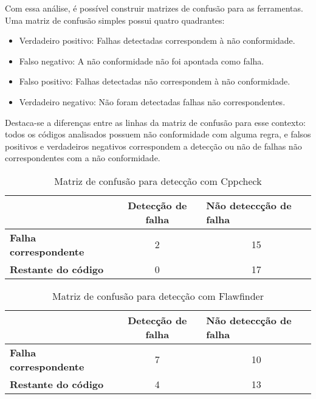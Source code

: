 Com essa análise, é possível construir matrizes de confusão para as ferramentas. Uma matriz de confusão simples possui quatro quadrantes:
\begin{itemize}
  \item Verdadeiro positivo: Falhas detectadas correspondem à não conformidade.
  \item Falso negativo: A não conformidade não foi apontada como falha.
  \item Falso positivo: Falhas detectadas não correspondem à não conformidade.
  \item Verdadeiro negativo: Não foram detectadas falhas não correspondentes.
\end{itemize}

Destaca-se a diferenças entre as linhas da matriz de confusão para esse contexto: todos os códigos analisados possuem não conformidade com alguma regra, e falsos positivos e verdadeiros negativos correspondem a detecção ou não de falhas não correspondentes com a não conformidade.

\begin{table}[ht]
  \begin{tabular}{@{}lcc@{}}
  \toprule
                      & \textbf{Detecção de falha} & \multicolumn{1}{l}{\textbf{Não deteccção de falha}} \\ \midrule
  \textbf{Falha correspondente} & 2                        & 15                                               \\
  \textbf{Restante do código} & 0                        & 17                                               \\ \bottomrule
  \end{tabular}
  \caption{Matriz de confusão para detecção com Cppcheck}
  \label{tab:cppcheck}
  \end{table}

\begin{table}[ht]
\begin{tabular}{@{}lcc@{}}
\toprule
                    & \textbf{Detecção de falha} & \multicolumn{1}{l}{\textbf{Não deteccção de falha}} \\ \midrule
\textbf{Falha correspondente} & 7                        & 10                                               \\
\textbf{Restante do código} & 4                        & 13                                               \\ \bottomrule
\end{tabular}
\caption{Matriz de confusão para detecção com Flawfinder}
\label{tab:flawfinder}
\end{table}

